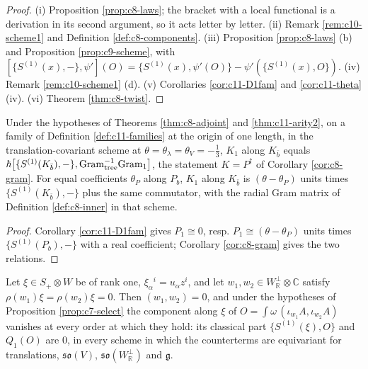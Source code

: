 \begin{proof}
(i) Proposition \ref{prop:c8-laws}; the bracket with a local functional is a derivation in its second argument, so it acts letter by letter. (ii) Remark \ref{rem:c10-scheme1} and Definition \ref{def:c8-components}. (iii) Proposition \ref{prop:c8-laws} (b) and Proposition \ref{prop:c9-scheme}, with $[\{S^{(1)}(x),-\},\psi'](O)=\{S^{(1)}(x),\psi'(O)\}-\psi'(\{S^{(1)}(x),O\})$. (iv) Remark \ref{rem:c10-scheme1} (d). (v) Corollaries \ref{cor:c11-D1fam} and \ref{cor:c11-theta} (iv). (vi) Theorem \ref{thm:c8-twist}.
\end{proof}

\begin{corollary}
\label{cor:c11-K}
Under the hypotheses of Theorems \ref{thm:c8-adjoint} and \ref{thm:c11-arity2}, on a family of Definition \ref{def:c11-families} at the origin of one length, in the translation-covariant scheme at $\theta=\theta_\lambda=\theta_V=-\tfrac13$, $K_1$ along $K_{\bar b}$ equals $\hbar\big[\{S^{(1)}(K_{\bar b}),-\},\mathrm{Gram}_{\rm tree}^{-1}\mathrm{Gram}_{\rm 1}\big]$, the statement $K=P^\dagger$ of Corollary \ref{cor:c8-gram}. For equal coefficients $\theta_P$ along $P_b$, $K_1$ along $K_{\bar b}$ is $(\theta-\theta_P)$ units times $\{S^{(1)}(K_{\bar b}),-\}$ plus the same commutator, with the radial Gram matrix of Definition \ref{def:c8-inner} in that scheme.
\end{corollary}

\begin{proof}
Corollary \ref{cor:c11-D1fam} gives $P_1\cong0$, resp. $P_1\cong(\theta-\theta_P)$ units times $\{S^{(1)}(P_b),-\}$ with a real coefficient; Corollary \ref{cor:c8-gram} gives the two relations.
\end{proof}

\begin{proposition}
\label{prop:c11-plane}
Let $\xi\in S_+\otimes W$ be of rank one, $\xi_\alpha{}^i=u_\alpha z^i$, and let $w_1,w_2\in W_{\mathbb R}^\perp\otimes\mathbb C$ satisfy $\rho(w_1)\xi=\rho(w_2)\xi=0$. Then $(w_1,w_2)=0$, and under the hypotheses of Proposition \ref{prop:c7-select} the component along $\xi$ of $O=\int\omega\,(\iota_{w_1}A,\iota_{w_2}A)$ vanishes at every order at which they hold: its classical part $\{S^{(1)}(\xi),O\}$ and $Q_1(O)$ are $0$, in every scheme in which the counterterms are equivariant for translations, $\mathfrak{so}(V)$, $\mathfrak{so}(W_{\mathbb R}^\perp)$ and $\mathfrak g$.
\end{proposition}


